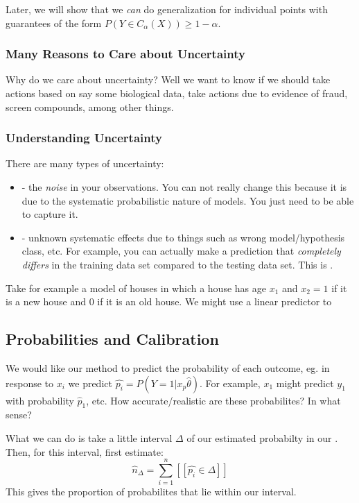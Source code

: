 \documentclass[11pt]{scrartcl}
\begin{document}
Later, we will show that we \textit{can} do generalization for individual points with guarantees of the form $P(Y \in C_\alpha(X)) \ge 1-\alpha$. 

\subsubsection{Many Reasons to Care about Uncertainty}
Why do we care about uncertainty? Well we want to know if we should take actions based on say some biological data, take actions due to evidence of fraud, screen compounds, among other things. 

\subsubsection{Understanding Uncertainty}
There are many types of uncertainty:
\begin{itemize}
    \item {} - the \textit{noise} in your observations. You can not really change this because it is due to the systematic probabilistic nature of models. You just need to be able to capture it.
    \item {} - unknown systematic effects due to things such as wrong model/hypothesis class, etc. For example, you can actually make a prediction that \textit{completely differs} in the training data set compared to the testing data set. This is .
\end{itemize}

\begin{ex}
Take for example a model of houses in which a house has age $x_1$ and $x_2=1$ if it is a new house and $0$ if it is an old house. We might use a linear predictor to 
\end{ex}

\subsection{Probabilities and Calibration}
We would like our method to predict the probability of each outcome, eg. in response to $x_i$ we predict $\hat{p_i}=P(Y=1|x_p\hat{\theta})$. For example, $x_1$ might predict $y_1$ with probability $\hat{p}_1$, etc. How accurate/realistic are these probabilites? In what sense? 

What we can do is take a little interval $\Delta$ of our estimated probabilty in our . Then, for this interval, first estimate:
$$\hat{n}_{\Delta}=\sum_{i=1}^{n}[[\hat{p_i} \in \Delta]]$$
This gives the proportion of probabilites that lie within our interval. 
\end{document}
